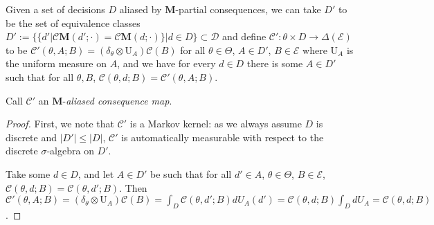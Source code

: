 \begin{lemma}{\label{lem:essential_decision}}
Given a set of decisions $D$ aliased by $\mathbf{M}$-partial consequences, we can take $D'$ to be the set of equivalence classes $D':=\{\{d'|\mathscr{C}\mathbf{M}(d';\cdot)=\mathscr{C}\mathbf{M}(d;\cdot)\}|d\in D\}\subset \mathcal{D}$ and define $\mathscr{C}':\theta\times D\to \Delta(\mathcal{E})$ to be $\mathscr{C}'(\theta,A;B) = (\delta_\theta\otimes \mathrm{U}_{A})\mathscr{C}(B)$ for all $\theta\in\Theta$, $A\in D'$, $B\in\mathcal{E}$ where $\mathrm{U}_A$ is the uniform measure on $A$, and we have for every $d\in D$ there is some $A\in D'$ such that for all $\theta, B$, $\mathscr{C}(\theta,d;B) = \mathscr{C}'(\theta,A;B)$.

Call $\mathscr{C}'$ an $\mathbf{M}$-\emph{aliased consequence map}.
\end{lemma}

\begin{proof}
First, we note that $\mathscr{C}'$ is a Markov kernel: as we always assume $D$ is discrete and $|D'|\leq |D|$, $\mathscr{C}'$ is automatically measurable with respect to the discrete $\sigma$-algebra on $D'$.

Take some $d\in D$, and let $A\in D'$ be such that for all $d'\in A$, $\theta\in \Theta$, $B\in \mathcal{E}$, $\mathscr{C}(\theta,d;B)=\mathscr{C}(\theta,d';B)$. Then $\mathscr{C}'(\theta,A;B)=(\delta_\theta\otimes \mathrm{U}_{A})\mathscr{C}(B) = \int_D \mathscr{C}(\theta,d';B) d U_A(d') = \mathscr{C}(\theta,d;B)\int_D dU_A = \mathscr{C}(\theta,d;B)$.
\end{proof}


\begin{theorem}\label{th:aliased_decisions}
 
\end{theorem}

\begin{theorem}\label{th:aliased_identification}

\end{theorem}